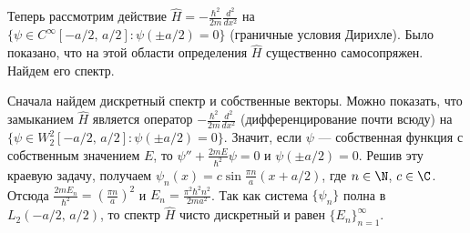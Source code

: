 \documentclass[a4paper
]{article}
\begin{document}
Теперь рассмотрим действие $\hat H=-\frac{\hbar^2}{2m}\frac{d^2}{dx^2}$ на
$\{\psi\in C^\infty[-a/2, \, a/2]:\psi(\pm a/2)=0\}$ (граничные условия
Дирихле). Было показано, что на этой области определения $\hat H$
существенно самосопряжен. Найдем его спектр. \par
Сначала найдем дискретный спектр и собственные векторы. Можно показать,
что замыканием $\hat H$ является оператор $-\frac{\hbar^2}{2m}\frac{d^2}
{dx^2}$ (дифференцирование почти всюду) на $\{\psi\in W^2_2[-a/2, \,
a/2]:\psi(\pm a/2)=0\}$. Значит, если $\psi$ --- собственная функция
с собственным значением $E$, то $\psi''+\frac{2mE}{\hbar^2}\psi=0$ и
$\psi(\pm a/2)=0$. Решив эту краевую задачу, получаем $\psi_n(x)=
c\sin \frac{\pi n}{a}(x+a/2)$, где $n\in \N$, $c\in \C$. Отсюда
$\frac{2mE_n}{\hbar^2}=\left(\frac{\pi n}{a}\right)^2$ и $E_n=\frac{\pi^2
\hbar^2 n^2}{2ma^2}$. Так как система $\{\psi_n\}$ полна в $L_2(-a/2, \,
a/2)$, то спектр $\hat H$ чисто дискретный и равен $\{E_n\}_{n=1}^\infty$.
\end{document}

